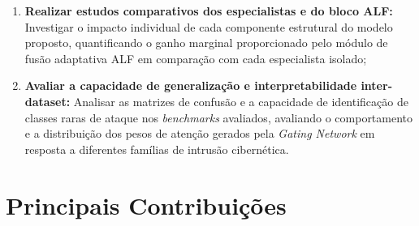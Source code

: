 \begin{enumerate}
    \item \textbf{Realizar estudos comparativos dos especialistas e do bloco ALF:} Investigar o impacto individual de cada componente estrutural do modelo proposto, quantificando o ganho marginal proporcionado pelo módulo de fusão adaptativa ALF em comparação com cada especialista isolado;
    \item \textbf{Avaliar a capacidade de generalização e interpretabilidade inter-dataset:} Analisar as matrizes de confusão e a capacidade de identificação de classes raras de ataque nos \emph{benchmarks} avaliados, avaliando o comportamento e a distribuição dos pesos de atenção gerados pela \emph{Gating Network} em resposta a diferentes famílias de intrusão cibernética.
\end{enumerate}

\section{Principais Contribuições}
\label{sec:contribuicoes}


